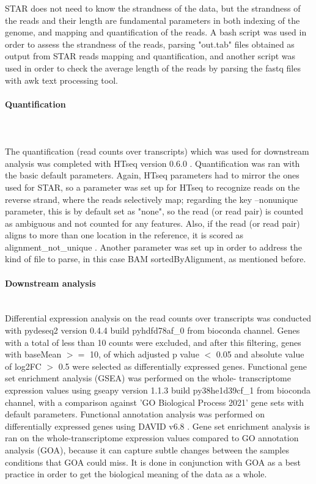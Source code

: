 \documentclass[12pt]{article}
\begin{document}
STAR does not need to know the strandness of the data, but the strandness of the reads and their length are fundamental parameters in both indexing of the genome, and mapping and quantification of the reads. A bash script was used in order to assess the strandness of the reads, parsing "out.tab" files obtained as output from STAR reads mapping and quantification, and another script was used in order to check the average length of the reads by parsing the fastq files with awk text processing tool.
\paragraph{Quantification}\hspace{0pt}\\\\
\noindent The quantification (read counts over transcripts) which was used for downstream analysis was completed 
with HTseq version 0.6.0 \supercite{anders2015htseq}. Quantification was ran with the basic default parameters.
Again, HTseq parameters had to mirror the ones used for STAR, so a parameter was set up for HTseq to recognize reads on the reverse strand, where the reads selectively map; regarding the key --nonunique parameter, this is by default set as "none", so the read (or read pair) is counted as ambiguous and not counted for any features. Also, if the read (or read pair) aligns to more than one location in the reference, it is scored as alignment\_not\_unique \supercite{htseq_docs}. Another parameter was set up in order to address the kind of file to parse, in this case BAM sortedByAlignment, as mentioned before. 
\paragraph{Downstream analysis}\hspace{0pt}\\

\noindent Differential 
expression analysis on the read counts over transcripts was conducted with pydeseq2 \supercite{muzellec2023pydeseq2} version 0.4.4 build 
pyhdfd78af\_0 from bioconda channel. Genes with a total of less than 10 counts were excluded, and after this filtering, genes with baseMean $>=$ 
10, of which adjusted p value $<$ 0.05 and absolute value of log2FC $>$ 0.5 
were selected as differentially expressed genes. Functional gene set enrichment analysis (GSEA) was performed on the whole-
transcriptome expression values using gseapy \supercite{fang2023gseapy} 
version 1.1.3 build py38he1d39cf\_1 from bioconda channel, with a comparison against 'GO Biological Process 2021' gene sets with default 
parameters. Functional annotation analysis was performed on differentially expressed genes using DAVID v6.8 \supercite{huang2007david,huang2007david_2}. Gene set enrichment analysis is ran on the whole-transcriptome expression values compared to GO annotation analysis (GOA), because it can capture subtle changes between the samples conditions that GOA could miss. It is done in conjunction with GOA as a best practice in order to get the biological meaning of the data as a whole.
\end{document}
